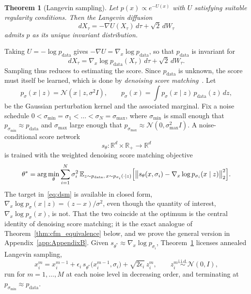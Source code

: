 \documentclass[a4paper,12pt]{article}
\newtheorem{theorem}{Theorem}[section]
\theoremstyle{remark}
\begin{document}
\begin{theorem}[Langevin sampling]
\label{thm:langevin}
Let $p(x)\propto e^{-U(x)}$ with $U$ satisfying suitable regularity conditions. Then the
Langevin diffusion
\[
dX_\tau=-\nabla U(X_\tau)\,d\tau+\sqrt2\,dW_\tau
\]
admits $p$ as its unique invariant distribution.
\end{theorem}

Taking $U=-\log p_{\mathrm{data}}$ gives $-\nabla U=\nabla_x\log p_{\mathrm{data}}$, so
that $p_{\mathrm{data}}$ is invariant for
\[
dX_\tau=\nabla_x\log p_{\mathrm{data}}(X_\tau)\,d\tau+\sqrt2\,dW_\tau .
\]
Sampling thus reduces to estimating the score. Since $p_{\mathrm{data}}$ is unknown,
the score must itself be learned, which is done by \emph{denoising score
matching}~\cite{bortoliRiemannianScoreBasedGenerative2022}. Let
\[
p_\sigma(x\mid z)=\mathcal N(x\mid z,\sigma^2 I),
\qquad
p_\sigma(x)=\int p_\sigma(x\mid z)\,p_{\mathrm{data}}(z)\,dz ,
\]
be the Gaussian perturbation kernel and the associated marginal. Fix a noise schedule
$0<\sigma_{\min}=\sigma_1<\dots<\sigma_N=\sigma_{\max}$, where $\sigma_{\min}$ is small
enough that $p_{\sigma_{\min}}\approx p_{\mathrm{data}}$ and $\sigma_{\max}$ large
enough that $p_{\sigma_{\max}}\approx\mathcal N(0,\sigma_{\max}^2I)$. A noise-conditional
score network
\[
s_\theta:\mathbb R^d\times\mathbb R_+\rightarrow\mathbb R^d
\]
is trained with the weighted denoising score matching objective
\begin{equation}
\label{eq:dsm}
\theta^{*}
=
\arg \min_{\theta}
\sum_{i=1}^{N}
\sigma_i^{2}\,
\mathbb E_{z\sim p_{\mathrm{data}},\,x\sim p_{\sigma_i}(\cdot\mid z)}
\Bigl[
\bigl\|
s_{\theta}(x,\sigma_i)-\nabla_{x}\log p_{\sigma_i}(x\mid z)
\bigr\|_2^2
\Bigr].
\end{equation}
The target in~\eqref{eq:dsm} is available in closed form,
$\nabla_x\log p_\sigma(x\mid z)=(z-x)/\sigma^2$, even though the quantity of interest,
$\nabla_x\log p_{\sigma}(x)$, is not. That the two coincide at the optimum is the
central identity of denoising score matching; it is the exact analogue of
Theorem~\ref{thm:cfm_equivalence} below, and we prove the general version in
Appendix~\ref{app:AppendixB}. Given $s_{\theta^*}\approx\nabla_x\log p_{\sigma_i}$,
Theorem~\ref{thm:langevin} licenses annealed Langevin sampling,
\[
x_i^{m}
=
x_i^{m-1}
+
\epsilon_i\,s_{\theta^*}\!\bigl(x_i^{m-1},\sigma_i\bigr)
+
\sqrt{2\epsilon_i}\,z_i^{m},
\qquad
z_i^{m}\overset{\text{i.i.d.}}{\sim}\mathcal N(0,I),
\]
run for $m=1,\dots,M$ at each noise level in decreasing order, and terminating at
$p_{\sigma_{\min}}\approx p_{\mathrm{data}}$.
\end{document}

